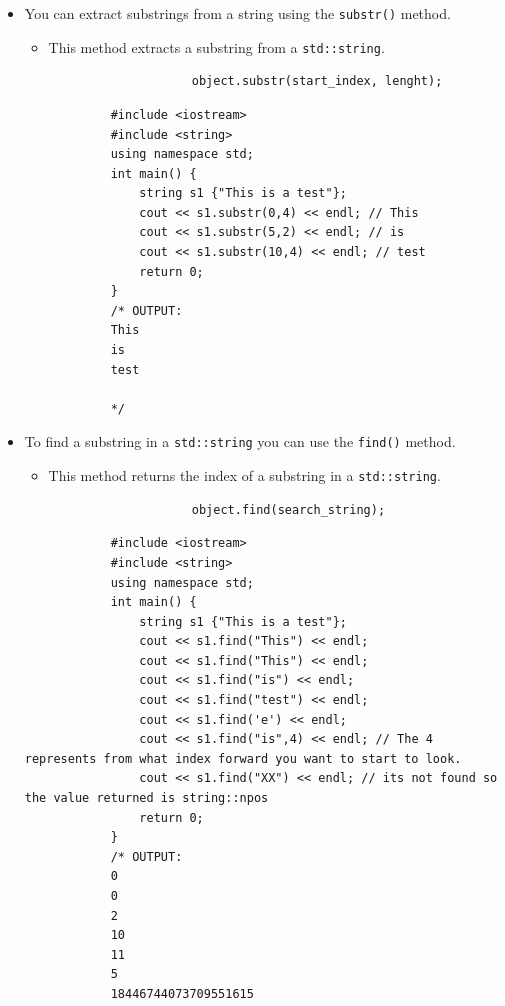 \begin{itemize}
\begin{verbatim}
            */
        \end{verbatim}
    
    \item You can extract substrings from a string using the \texttt{substr()} method.
        \begin{itemize}
            \item This method extracts a substring from a \texttt{std::string}.
                \begin{verbatim}
                    object.substr(start_index, lenght);
                \end{verbatim}
        \end{itemize}
        \begin{verbatim}
            #include <iostream>
            #include <string>
            using namespace std;
            int main() {
                string s1 {"This is a test"};
                cout << s1.substr(0,4) << endl; // This
                cout << s1.substr(5,2) << endl; // is
                cout << s1.substr(10,4) << endl; // test
                return 0;
            }
            /* OUTPUT:
            This
            is
            test

            */
        \end{verbatim}
    
    \item To find a substring in a \texttt{std::string} you can use the \texttt{find()} method.
        \begin{itemize}
            \item This method returns the index of a substring in a \texttt{std::string}.
                \begin{verbatim}
                    object.find(search_string);
                \end{verbatim}
        \end{itemize}
        \begin{verbatim}
            #include <iostream>
            #include <string>
            using namespace std;
            int main() {
                string s1 {"This is a test"};
                cout << s1.find("This") << endl;
                cout << s1.find("This") << endl;
                cout << s1.find("is") << endl;
                cout << s1.find("test") << endl;
                cout << s1.find('e') << endl;
                cout << s1.find("is",4) << endl; // The 4 represents from what index forward you want to start to look.
                cout << s1.find("XX") << endl; // its not found so the value returned is string::npos
                return 0;
            }
            /* OUTPUT:
            0
            0
            2
            10
            11
            5
            18446744073709551615


\end{verbatim}
\end{itemize}
